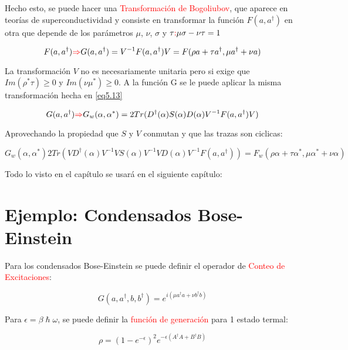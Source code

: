 \documentclass{book}
\begin{document}
Hecho esto, se puede hacer una \textcolor{red}{Transformación de Bogoliubov}, que aparece en teorías de superconductividad y consiste en transformar la función $F(a,a^\dag)$ en otra que depende de los parámetros $\mu$, $\nu$, $\sigma$ y $\tau\textcolor{red}{:} \mu\sigma-\nu\tau=1$

\begin{equation}\label{eq5.17}F(a,a^\dag)\textcolor{red}{\Rightarrow} G(a,a^\dag)= V^{-1}F(a,a^\dag)V=F(\rho a+\tau a^\dag, \mu a^\dag+\nu a)\end{equation}

La transformación $V$ no es necesariamente unitaria pero si exige que $Im(\rho^*\tau)\geq 0$ y $Im(\nu\mu^*)\geq 0$.  A la función G se le puede aplicar la misma transformación hecha en \ref{eq5.13}

\begin{equation}\label{eq5.18}G(a,a^\dag)\textcolor{red}{\Rightarrow}G_w(\alpha,\alpha^*)=2Tr(D^\dag(\alpha)S(\alpha)D(\alpha)V^{-1} F(a,a^\dag)V)\end{equation}

Aprovechando la propiedad que $S$ y $V$ conmutan y que las trazas son ciclicas:

\begin{equation}\label{eq5.19}G_w(\alpha,\alpha^*)2Tr(VD^\dag(\alpha)V^{-1} V S(\alpha) V^{-1} VD(\alpha)V^{-1} F(a,a^\dag))=F_w(\rho\alpha+\tau\alpha^*,\mu\alpha^*+\nu\alpha)\end{equation}

Todo lo visto en el capítulo se usará en el siguiente capítulo:


\section{Ejemplo: Condensados Bose-Einstein}

Para los condensados Bose-Einstein se puede definir el operador de \textcolor{red}{Conteo de Excitaciones}:

\begin{equation}\label{eq5.20}G(a,a^\dag,b,b^\dag)=e^{i(\mu a^\dag a+\nu b^\dag b)}\end{equation}

Para $\epsilon=\beta\hslash\omega$, se puede definir la \textcolor{red}{función de generación} para 1 estado termal:

\begin{equation}\label{eq5.21}\rho=(1-e^{-\epsilon})^2e^{-\epsilon(A^\dag A+B^\dag B)}\end{equation}
\end{document}
